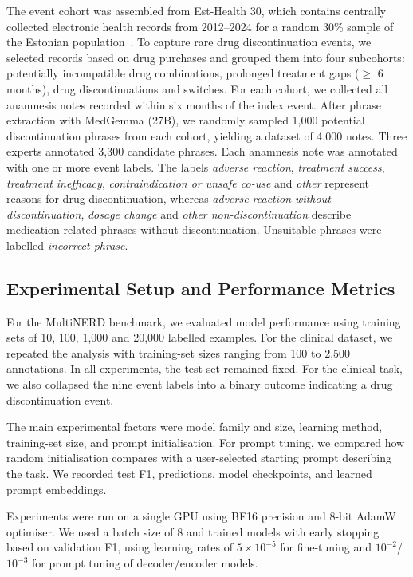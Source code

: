 The event cohort was assembled from Est-Health 30, which contains
centrally collected electronic health records from 2012--2024 for a
random 30\% sample of the Estonian
population~\cite{reisberg2026eh30}. To capture rare drug
discontinuation events, we selected records based on drug purchases
and grouped them into four subcohorts: potentially incompatible drug
combinations, prolonged treatment gaps ($\geq$ 6 months), drug
discontinuations and switches. For each cohort, we collected all
anamnesis notes recorded within six months of the index event. After
phrase extraction with MedGemma (27B), we randomly sampled 1,000
potential discontinuation phrases from each cohort, yielding a
dataset of 4,000 notes. Three experts annotated 3,300 candidate
phrases. Each anamnesis note was annotated with one or more event
labels. The labels \emph{adverse reaction}, \emph{treatment success},
\emph{treatment inefficacy}, \emph{contraindication or unsafe co-use}
and \emph{other} represent reasons for drug discontinuation, whereas
\emph{adverse reaction without discontinuation}, \emph{dosage change}
and \emph{other non-discontinuation} describe medication-related
phrases without discontinuation. Unsuitable phrases were labelled
\emph{incorrect phrase}.

\subsection{Experimental Setup and Performance Metrics}

For the MultiNERD benchmark, we evaluated model performance using
training sets of 10, 100, 1,000 and 20,000 labelled examples. For the
clinical dataset, we repeated the analysis with training-set sizes
ranging from 100 to 2,500 annotations. In all experiments, the test
set remained fixed. For the clinical task, we also collapsed the nine
event labels into a binary outcome indicating a drug discontinuation event.

The main experimental factors were model family and size, learning
method, training-set size, and prompt initialisation. For prompt
tuning, we compared how random initialisation compares with a
user-selected starting prompt describing the task. We recorded test
F1, predictions, model checkpoints, and learned prompt embeddings.

Experiments were run on a single GPU using BF16 precision and 8-bit
AdamW optimiser. We used a batch size of 8 and trained models with
early stopping based on validation F1, using learning rates of $5
\times 10^{-5}$ for fine-tuning and $10^{-2}$/$10^{-3}$ for prompt
tuning of decoder/encoder models.

